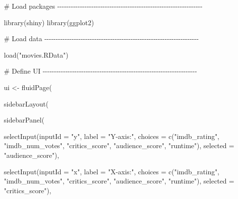 \documentclass[
  letterpaper,
  DIV=11,
  numbers=noendperiod]{scrreprt}
\newenvironment{Shaded}{\begin{snugshade}}{\end{snugshade}}
\newcommand{\AttributeTok}[1]{\textcolor[rgb]{0.40,0.46,0.14}{#1}}
\newcommand{\CommentTok}[1]{\textcolor[rgb]{0.37,0.37,0.37}{#1}}
\newcommand{\FunctionTok}[1]{\textcolor[rgb]{0.28,0.35,0.67}{#1}}
\newcommand{\NormalTok}[1]{\textcolor[rgb]{0.00,0.46,0.62}{#1}}
\newcommand{\OtherTok}[1]{\textcolor[rgb]{0.00,0.46,0.62}{#1}}
\newcommand{\StringTok}[1]{\textcolor[rgb]{0.13,0.47,0.30}{#1}}
\begin{document}
\begin{Shaded}
\begin{Highlighting}[]
\CommentTok{\# Load packages {-}{-}{-}{-}{-}{-}{-}{-}{-}{-}{-}{-}{-}{-}{-}{-}{-}{-}{-}{-}{-}{-}{-}{-}{-}{-}{-}{-}{-}{-}{-}{-}{-}{-}{-}{-}{-}{-}{-}{-}{-}{-}{-}{-}{-}{-}{-}{-}{-}{-}{-}{-}{-}{-}{-}{-}{-}{-}{-}{-}{-}{-}{-}{-}}

\FunctionTok{library}\NormalTok{(shiny)}
\FunctionTok{library}\NormalTok{(ggplot2)}

\CommentTok{\# Load data {-}{-}{-}{-}{-}{-}{-}{-}{-}{-}{-}{-}{-}{-}{-}{-}{-}{-}{-}{-}{-}{-}{-}{-}{-}{-}{-}{-}{-}{-}{-}{-}{-}{-}{-}{-}{-}{-}{-}{-}{-}{-}{-}{-}{-}{-}{-}{-}{-}{-}{-}{-}{-}{-}{-}{-}{-}{-}{-}{-}{-}{-}{-}{-}{-}{-}{-}{-}}

\FunctionTok{load}\NormalTok{(}\StringTok{"movies.RData"}\NormalTok{)}

\CommentTok{\# Define UI {-}{-}{-}{-}{-}{-}{-}{-}{-}{-}{-}{-}{-}{-}{-}{-}{-}{-}{-}{-}{-}{-}{-}{-}{-}{-}{-}{-}{-}{-}{-}{-}{-}{-}{-}{-}{-}{-}{-}{-}{-}{-}{-}{-}{-}{-}{-}{-}{-}{-}{-}{-}{-}{-}{-}{-}{-}{-}{-}{-}{-}{-}{-}{-}{-}{-}{-}{-}}

\NormalTok{ui }\OtherTok{\textless{}{-}} \FunctionTok{fluidPage}\NormalTok{(}
  
  \FunctionTok{sidebarLayout}\NormalTok{(}
    
    \FunctionTok{sidebarPanel}\NormalTok{(}
      
      \FunctionTok{selectInput}\NormalTok{(}\AttributeTok{inputId =} \StringTok{"y"}\NormalTok{, }
                  \AttributeTok{label =} \StringTok{"Y{-}axis:"}\NormalTok{,}
                  \AttributeTok{choices =} \FunctionTok{c}\NormalTok{(}\StringTok{"imdb\_rating"}\NormalTok{, }\StringTok{"imdb\_num\_votes"}\NormalTok{, }\StringTok{"critics\_score"}\NormalTok{, }\StringTok{"audience\_score"}\NormalTok{, }\StringTok{"runtime"}\NormalTok{), }
                  \AttributeTok{selected =} \StringTok{"audience\_score"}\NormalTok{),}
      
      \FunctionTok{selectInput}\NormalTok{(}\AttributeTok{inputId =} \StringTok{"x"}\NormalTok{, }
                  \AttributeTok{label =} \StringTok{"X{-}axis:"}\NormalTok{,}
                  \AttributeTok{choices =} \FunctionTok{c}\NormalTok{(}\StringTok{"imdb\_rating"}\NormalTok{, }\StringTok{"imdb\_num\_votes"}\NormalTok{, }\StringTok{"critics\_score"}\NormalTok{, }\StringTok{"audience\_score"}\NormalTok{, }\StringTok{"runtime"}\NormalTok{), }
                  \AttributeTok{selected =} \StringTok{"critics\_score"}\NormalTok{),}
      

\end{Highlighting}
\end{Shaded}
\end{document}
